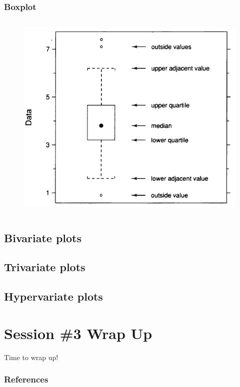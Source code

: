 \documentclass[aspectratio=1610]{beamer}
\begin{document}
\begin{frame}
	\frametitle{Boxplot}
	\begin{columns}
		\begin{figure}
			\begin{center}
				\includegraphics[width=1.0\textwidth]{figures/boxplot.png}
			\end{center}
		\end{figure}
	\end{columns}
\end{frame}


\subsection{Bivariate plots}


\subsection{Trivariate plots}


\subsection{Hypervariate plots}



\section{Session \#3 Wrap Up}

\begin{frame}{}{}
	\LARGE \centering Time to wrap up!
\end{frame}

\begin{frame}
	\frametitle{References}
	\printbibliography
\end{frame}
\end{document}
